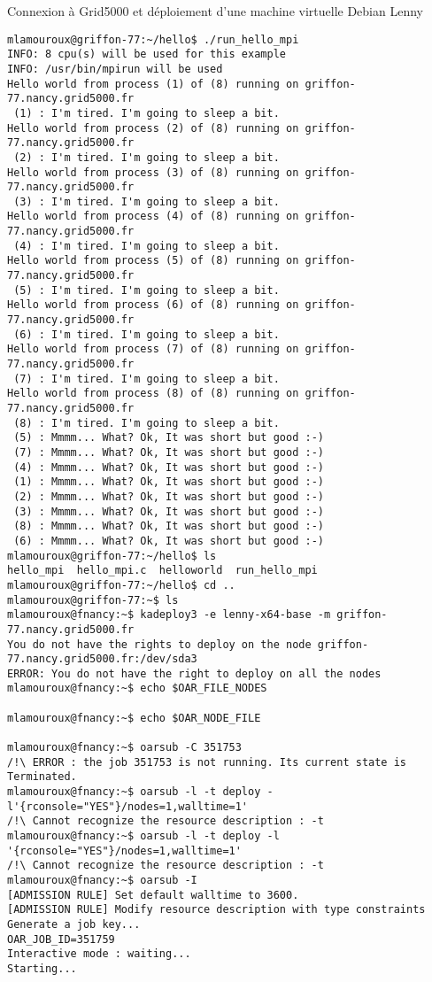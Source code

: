 Connexion à Grid5000 et déploiement d'une machine virtuelle Debian Lenny 
\begin{lstlisting}
mlamouroux@griffon-77:~/hello$ ./run_hello_mpi 
INFO: 8 cpu(s) will be used for this example
INFO: /usr/bin/mpirun will be used
Hello world from process (1) of (8) running on griffon-77.nancy.grid5000.fr
 (1) : I'm tired. I'm going to sleep a bit.
Hello world from process (2) of (8) running on griffon-77.nancy.grid5000.fr
 (2) : I'm tired. I'm going to sleep a bit.
Hello world from process (3) of (8) running on griffon-77.nancy.grid5000.fr
 (3) : I'm tired. I'm going to sleep a bit.
Hello world from process (4) of (8) running on griffon-77.nancy.grid5000.fr
 (4) : I'm tired. I'm going to sleep a bit.
Hello world from process (5) of (8) running on griffon-77.nancy.grid5000.fr
 (5) : I'm tired. I'm going to sleep a bit.
Hello world from process (6) of (8) running on griffon-77.nancy.grid5000.fr
 (6) : I'm tired. I'm going to sleep a bit.
Hello world from process (7) of (8) running on griffon-77.nancy.grid5000.fr
 (7) : I'm tired. I'm going to sleep a bit.
Hello world from process (8) of (8) running on griffon-77.nancy.grid5000.fr
 (8) : I'm tired. I'm going to sleep a bit.
 (5) : Mmmm... What? Ok, It was short but good :-)
 (7) : Mmmm... What? Ok, It was short but good :-)
 (4) : Mmmm... What? Ok, It was short but good :-)
 (1) : Mmmm... What? Ok, It was short but good :-)
 (2) : Mmmm... What? Ok, It was short but good :-)
 (3) : Mmmm... What? Ok, It was short but good :-)
 (8) : Mmmm... What? Ok, It was short but good :-)
 (6) : Mmmm... What? Ok, It was short but good :-)
mlamouroux@griffon-77:~/hello$ ls
hello_mpi  hello_mpi.c	helloworld  run_hello_mpi
mlamouroux@griffon-77:~/hello$ cd ..
mlamouroux@griffon-77:~$ ls
mlamouroux@fnancy:~$ kadeploy3 -e lenny-x64-base -m griffon-77.nancy.grid5000.fr
You do not have the rights to deploy on the node griffon-77.nancy.grid5000.fr:/dev/sda3
ERROR: You do not have the right to deploy on all the nodes
mlamouroux@fnancy:~$ echo $OAR_FILE_NODES

mlamouroux@fnancy:~$ echo $OAR_NODE_FILE

mlamouroux@fnancy:~$ oarsub -C 351753
/!\ ERROR : the job 351753 is not running. Its current state is Terminated.
mlamouroux@fnancy:~$ oarsub -l -t deploy -l'{rconsole="YES"}/nodes=1,walltime=1'
/!\ Cannot recognize the resource description : -t
mlamouroux@fnancy:~$ oarsub -l -t deploy -l '{rconsole="YES"}/nodes=1,walltime=1'
/!\ Cannot recognize the resource description : -t
mlamouroux@fnancy:~$ oarsub -I
[ADMISSION RULE] Set default walltime to 3600.
[ADMISSION RULE] Modify resource description with type constraints
Generate a job key...
OAR_JOB_ID=351759
Interactive mode : waiting...
Starting...


\end{lstlisting}
